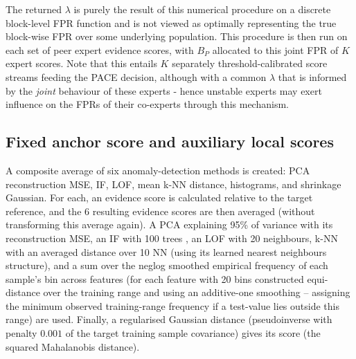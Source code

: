 The returned $\lambda$ is purely the result of this numerical procedure on a discrete block-level FPR function and is not viewed as optimally representing the true block-wise FPR over some underlying population. This procedure is then run on each set of peer expert evidence scores, with $B_P$ allocated to this joint FPR of $K$ expert scores. Note that this entails $K$ separately threshold-calibrated score streams feeding the PACE decision, although with a common $\lambda$ that is informed by the \emph{joint} behaviour of these experts - hence unstable experts may exert influence on the FPRs of their co-experts through this mechanism.

\FloatBarrier 
\subsection{Fixed anchor score and auxiliary local scores} 
A composite average of six anomaly-detection methods is created: PCA reconstruction MSE, IF, LOF, mean k-NN distance, histograms, and shrinkage Gaussian. For each, an evidence score is calculated relative to the target reference, and the $6$ resulting evidence scores are then averaged (without transforming this average again). A PCA explaining 95\% of variance with its reconstruction MSE, an IF with 100 trees \cite{liu2008isolation}, an LOF \cite{breunig2000lof} with 20 neighbours, k-NN with an averaged distance over 10 NN (using its learned nearest neighbours structure), and a sum over the neglog smoothed empirical frequency of each sample's bin across features (for each feature with 20 bins constructed equi-distance over the training range and using an additive-one smoothing -- assigning the minimum observed training-range frequency if a test-value lies outside this range) are used. Finally, a regularised Gaussian distance (pseudoinverse with penalty $0.001$ of the target training sample covariance) gives its score (the squared Mahalanobis distance).

